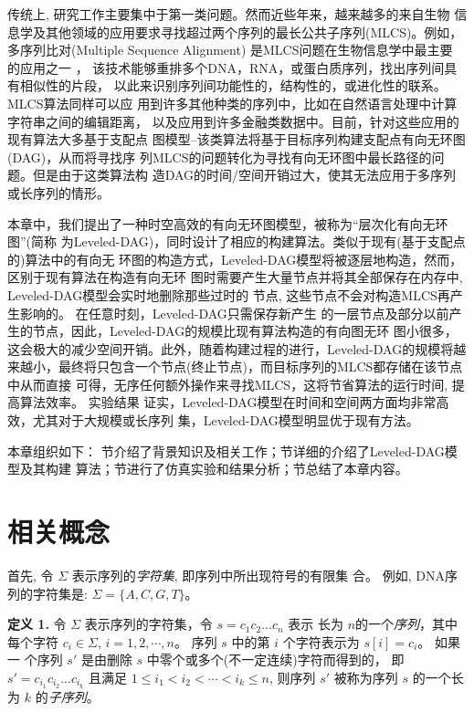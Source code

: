 传统上, 研究工作主要集中于第一类问题。然而近些年来，越来越多的来自生物
信息学及其他领域的应用要求寻找超过两个序列的最长公共子序列(MLCS)。例如，
多序列比对(Multiple Sequence Alignment) 是MLCS问题在生物信息学中最主要
的应用之一 \cite{Katoh2016,Zou2015,Mirarab2015,Bawono2017,Chatzou2015}，
该技术能够重排多个DNA，RNA，或蛋白质序列，找出序列间具有相似性的片段，
以此来识别序列间功能性的，结构性的，或进化性的联系。 MLCS算法同样可以应
用到许多其他种类的序列中，比如在自然语言处理中计算字符串之间的编辑距离，
以及应用到许多金融类数据中。目前，针对这些应用的现有算法大多基于支配点
图模型--该类算法将基于目标序列构建支配点有向无环图(DAG)，从而将寻找序
列MLCS的问题转化为寻找有向无环图中最长路径的问题。但是由于这类算法构
造DAG的时间/空间开销过大，使其无法应用于多序列或长序列的情形。

本章中，我们提出了一种时空高效的有向无环图模型，被称为“层次化有向无环图”(简称
为Leveled-DAG)，同时设计了相应的构建算法。类似于现有(基于支配点的)算法中的有向无
环图的构造方式，Leveled-DAG模型将被逐层地构造，然而，区别于现有算法在构造有向无环
图时需要产生大量节点并将其全部保存在内存中, Leveled-DAG模型会实时地删除那些过时的
节点, 这些节点不会对构造MLCS再产生影响的。 在任意时刻，Leveled-DAG只需保存新产生
的一层节点及部分以前产生的节点，因此，Leveled-DAG的规模比现有算法构造的有向图无环
图小很多，这会极大的减少空间开销。此外，随着构建过程的进行，Leveled-DAG的规模将越
来越小，最终将只包含一个节点(终止节点)，而目标序列的MLCS都存储在该节点中从而直接
可得，无序任何额外操作来寻找MLCS，这将节省算法的运行时间, 提高算法效率。 实验结果
证实，Leveled-DAG模型在时间和空间两方面均非常高效，尤其对于大规模或长序列
集，Leveled-DAG模型明显优于现有方法。

本章组织如下： 节介绍了背景知识及相关工作；节详细的介绍了Leveled-DAG模型及其构建
算法；节进行了仿真实验和结果分析；节总结了本章内容。

\section{相关概念}
\label{sec:MM}

首先, 令 $\Sigma$ 表示序列的\emph{字符集}, 即序列中所出现符号的有限集
合。 例如, DNA序列的字符集是: $\Sigma=\{A, C, G, T\}$。

\textbf{定义 1.} 令 $\Sigma$ 表示序列的字符集，令 $s=c_1c_2...c_n$ 表示
长为 $n$的一个\emph{序列}，其中每个字符 $c_i\in\Sigma$,
$i=1,2,\cdots,n$。 序列 $s$ 中的第 $i$ 个字符表示为 $s[i]=c_i$。 如果一
个序列 $s'$ 是由删除 $s$ 中零个或多个(不一定连续)字符而得到的，
即 $s'=c_{i_1}c_{i_2}...c_{i_k}$ 且满足
$1 \leq i_1<i_2<\cdots<i_k \leq n$, 则序列 $s'$ 被称为序列 $s$ 的一个长
为 $k$ 的\emph{子序列}。

